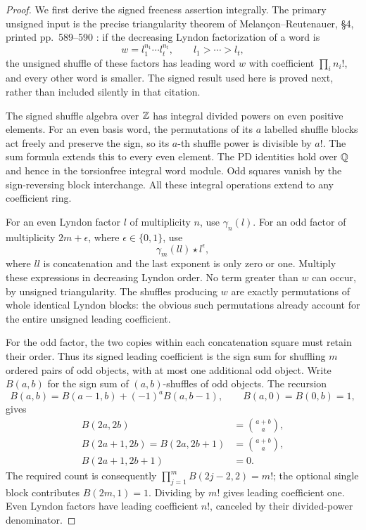 \begin{proof}
We first derive the signed freeness assertion integrally. The primary
unsigned input is the precise triangularity theorem of
Melan\c{c}on--Reutenauer, \S4, printed pp.~589--590
\cite{C_melancon_reutenauer1989}: if the decreasing Lyndon
factorization of a word is
\[
 w=l_1^{n_1}\cdots l_t^{n_t},\qquad l_1>\cdots>l_t,
\]
the unsigned shuffle of these factors has leading word $w$ with
coefficient $\prod_i n_i!$, and every other word is smaller.
The signed result used here is proved next, rather than included
silently in that citation.

The signed shuffle algebra over $\mathbb Z$ has integral divided powers
on even positive elements. For an even basis word, the permutations
of its $a$ labelled shuffle blocks act freely and preserve the
sign, so its $a$-th shuffle power is divisible by $a!$. The sum
formula extends this to every even element. The PD identities
hold over $\mathbb Q$ and hence in the torsionfree integral word module.
Odd squares vanish by the sign-reversing block interchange.
All these integral operations extend to any coefficient ring.

For an even Lyndon factor $l$ of multiplicity $n$, use
$\gamma_n(l)$. For an odd factor of multiplicity $2m+\epsilon$,
where $\epsilon\in\{0,1\}$, use
\[
 \gamma_m(ll)\mathbin{\star}l^\epsilon,
\]
where $ll$ is concatenation and the last exponent is only zero or
one. Multiply these expressions in decreasing Lyndon order.
No term greater than $w$ can occur, by unsigned triangularity.
The shuffles producing $w$ are exactly permutations of whole
identical Lyndon blocks: the obvious such permutations already
account for the entire unsigned leading coefficient.

For the odd factor, the two copies within each concatenation
square must retain their order. Thus its signed leading coefficient
is the sign sum for shuffling $m$ ordered pairs of odd objects,
with at most one additional odd object. Write $B(a,b)$ for the
sign sum of $(a,b)$-shuffles of odd objects. The recursion
\[
 B(a,b)=B(a-1,b)+(-1)^aB(a,b-1),\qquad
 B(a,0)=B(0,b)=1,
\]
gives
\begin{align*}
 B(2a,2b)&=\binom{a+b}{a},\\
 B(2a+1,2b)=B(2a,2b+1)&=\binom{a+b}{a},\\
 B(2a+1,2b+1)&=0.
\end{align*}
The required count is consequently
$\prod_{j=1}^m B(2j-2,2)=m!$; the optional single block
contributes $B(2m,1)=1$. Dividing by $m!$ gives leading
coefficient one. Even Lyndon factors have leading coefficient
$n!$, canceled by their divided-power denominator.


\end{proof}

